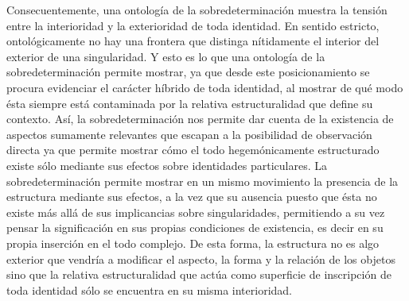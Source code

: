 \documentclass{book}
\begin{document}
Consecuentemente, una ontología de la sobredeterminación muestra la
tensión entre la interioridad y la exterioridad de toda identidad. En
sentido estricto, ontológicamente no hay una frontera que distinga
nítidamente el interior del exterior de una singularidad. Y esto es lo
que una ontología de la sobredeterminación permite mostrar, ya que desde
este posicionamiento se procura evidenciar el carácter híbrido de toda
identidad, al mostrar de qué modo ésta siempre está contaminada por la
relativa estructuralidad que define su contexto. Así, la
sobredeterminación nos permite dar cuenta de la existencia de aspectos
sumamente relevantes que escapan a la posibilidad de observación directa
ya que permite mostrar cómo el todo hegemónicamente estructurado existe
sólo mediante sus efectos sobre identidades particulares. La
sobredeterminación permite mostrar en un mismo movimiento la presencia
de la estructura mediante sus efectos, a la vez que su ausencia puesto
que ésta no existe más allá de sus implicancias sobre singularidades,
permitiendo a su vez pensar la significación en sus propias condiciones
de existencia, es decir en su propia inserción en el todo complejo. De
esta forma, la estructura no es algo exterior que vendría a modificar el
aspecto, la forma y la relación de los objetos sino que la relativa
estructuralidad que actúa como superficie de inscripción de toda
identidad sólo se encuentra en su misma interioridad.
\end{document}
